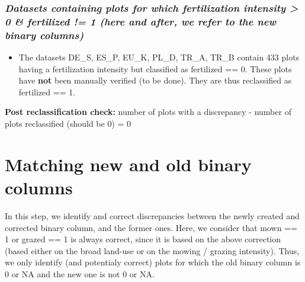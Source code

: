 \documentclass[table]{article}
\newenvironment{Shaded}{\begin{snugshade}}{\end{snugshade}}
\newcommand{\KeywordTok}[1]{\textcolor[rgb]{0.13,0.29,0.53}{\textbf{#1}}}
\newcommand{\DataTypeTok}[1]{\textcolor[rgb]{0.13,0.29,0.53}{#1}}
\newcommand{\DecValTok}[1]{\textcolor[rgb]{0.00,0.00,0.81}{#1}}
\newcommand{\StringTok}[1]{\textcolor[rgb]{0.31,0.60,0.02}{#1}}
\newcommand{\OperatorTok}[1]{\textcolor[rgb]{0.81,0.36,0.00}{\textbf{#1}}}
\newcommand{\NormalTok}[1]{#1}
\providecommand{\tightlist}{%
  \setlength{\itemsep}{0pt}\setlength{\parskip}{0pt}}
\begin{document}
\subsubsection{\texorpdfstring{\emph{Datasets containing plots for which
fertilization intensity \textgreater{} 0 \& fertilized != 1 (here and
after, we refer to the new binary
columns)}}{Datasets containing plots for which fertilization intensity \textgreater{} 0 \& fertilized != 1 (here and after, we refer to the new binary columns)}}\label{datasets-containing-plots-for-which-fertilization-intensity-0-fertilized-1-here-and-after-we-refer-to-the-new-binary-columns}

\begin{itemize}
\tightlist
\item
  The datasets DE\_S, ES\_P, EU\_K, PL\_D, TR\_A, TR\_B contain 433
  plots having a fertilization intensity but classified as fertilized ==
  0. These plots have \textbf{not} been manually verified (to be done).
  They are thus reclassified as fertilized == 1.
\end{itemize}

\begin{Shaded}
\end{Shaded}

\textbf{Post reclassification check:} number of plots with a discrepancy
- number of plots reclassified (should be 0) = 0

\section{Matching new and old binary
columns}\label{matching-new-and-old-binary-columns}

In this step, we identify and correct discrepancies between the newly
created and corrected binary column, and the former ones. Here, we
consider that mown == 1 or grazed == 1 is always correct, since it is
based on the above correction (based either on the broad land-use or on
the mowing / grazing intensity). Thus, we only identify (and potentialy
correct) plots for which the old binary column is 0 or NA and the new
one is not 0 or NA.
\end{document}
